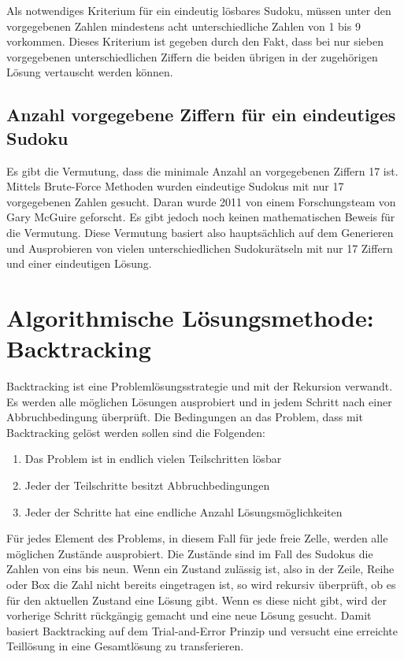 Als notwendiges Kriterium für ein eindeutig lösbares Sudoku, müssen unter den vorgegebenen Zahlen mindestens acht unterschiedliche Zahlen von 1 bis 9 vorkommen. Dieses Kriterium ist gegeben durch den Fakt, dass bei nur sieben vorgegebenen unterschiedlichen Ziffern die beiden übrigen in der zugehörigen Lösung vertauscht werden können. \cite{HerzbergMurty}

\subsection{Anzahl vorgegebene Ziffern für ein eindeutiges Sudoku}  
Es gibt die Vermutung, dass die minimale Anzahl an vorgegebenen Ziffern 17 ist. Mittels Brute-Force Methoden wurden eindeutige Sudokus mit nur 17 vorgegebenen Zahlen gesucht. Daran wurde 2011 von einem Forschungsteam von Gary McGuire geforscht. Es gibt jedoch noch keinen mathematischen Beweis für die Vermutung. Diese Vermutung basiert also hauptsächlich auf dem Generieren und Ausprobieren von vielen unterschiedlichen Sudokurätseln mit nur 17 Ziffern und einer eindeutigen Lösung. \cite{FAZ}

\section{Algorithmische Lösungsmethode: Backtracking}
Backtracking ist eine Problemlösungsstrategie und mit der Rekursion verwandt. Es werden alle möglichen Lösungen ausprobiert und in jedem Schritt nach einer Abbruchbedingung überprüft. Die Bedingungen an das Problem, dass mit Backtracking gelöst werden sollen sind die Folgenden: 
\begin{enumerate}
	\item Das Problem ist in endlich vielen Teilschritten lösbar
	\item Jeder der Teilschritte besitzt Abbruchbedingungen
	\item Jeder der Schritte hat eine endliche Anzahl Lösungsmöglichkeiten
\end{enumerate}

Für jedes Element des Problems, in diesem Fall für jede freie Zelle, werden alle möglichen Zustände ausprobiert. Die Zustände sind im Fall des Sudokus die Zahlen von eins bis neun. Wenn ein Zustand zulässig ist, also in der Zeile, Reihe oder Box die Zahl nicht bereits eingetragen ist, so wird rekursiv überprüft, ob es für den aktuellen Zustand eine Lösung gibt. Wenn es diese nicht gibt, wird der vorherige Schritt rückgängig gemacht und eine neue Lösung gesucht. 
Damit basiert Backtracking auf dem Trial-and-Error Prinzip und versucht eine erreichte Teillösung in eine Gesamtlösung zu transferieren. 

